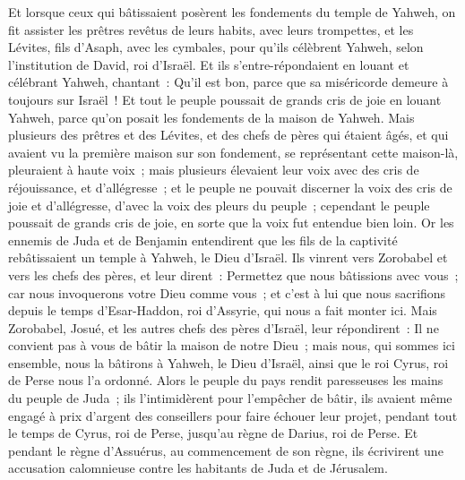 \begin{multicols}{2}
Et lorsque ceux qui bâtissaient posèrent les fondements du temple de Yahweh, on fit assister les prêtres revêtus de leurs habits, avec leurs trompettes, et les Lévites, fils d'Asaph, avec les cymbales, pour qu'ils célèbrent Yahweh, selon l'institution de David, roi d'Israël.
Et ils s'entre-répondaient en louant et célébrant Yahweh, chantant~: Qu'il est bon, parce que sa miséricorde demeure à toujours sur Israël~! Et tout le peuple poussait de grands cris de joie en louant Yahweh, parce qu'on posait les fondements de la maison de Yahweh.
Mais plusieurs des prêtres et des Lévites, et des chefs de pères qui étaient âgés, et qui avaient vu la première maison sur son fondement, se représentant cette maison-là, pleuraient à haute voix~; mais plusieurs élevaient leur voix avec des cris de réjouissance, et d'allégresse~;
et le peuple ne pouvait discerner la voix des cris de joie et d'allégresse, d'avec la voix des pleurs du peuple~; cependant le peuple poussait de grands cris de joie, en sorte que la voix fut entendue bien loin.
\VerseOne{}Or les ennemis de Juda et de Benjamin entendirent que les fils de la captivité rebâtissaient un temple à Yahweh, le Dieu d'Israël.
Ils vinrent vers Zorobabel et vers les chefs des pères, et leur dirent~: Permettez que nous bâtissions avec vous~; car nous invoquerons votre Dieu comme vous~; et c'est à lui que nous sacrifions depuis le temps d'Esar-Haddon, roi d'Assyrie, qui nous a fait monter ici.
Mais Zorobabel, Josué, et les autres chefs des pères d'Israël, leur répondirent~: Il ne convient pas à vous de bâtir la maison de notre Dieu~; mais nous, qui sommes ici ensemble, nous la bâtirons à Yahweh, le Dieu d'Israël, ainsi que le roi Cyrus, roi de Perse nous l'a ordonné.
Alors le peuple du pays rendit paresseuses les mains du peuple de Juda~; ils l'intimidèrent pour l'empêcher de bâtir,
ils avaient même engagé à prix d'argent des conseillers pour faire échouer leur projet, pendant tout le temps de Cyrus, roi de Perse, jusqu'au règne de Darius, roi de Perse.
Et pendant le règne d'Assuérus, au commencement de son règne, ils écrivirent une accusation calomnieuse contre les habitants de Juda et de Jérusalem.

\end{multicols}
